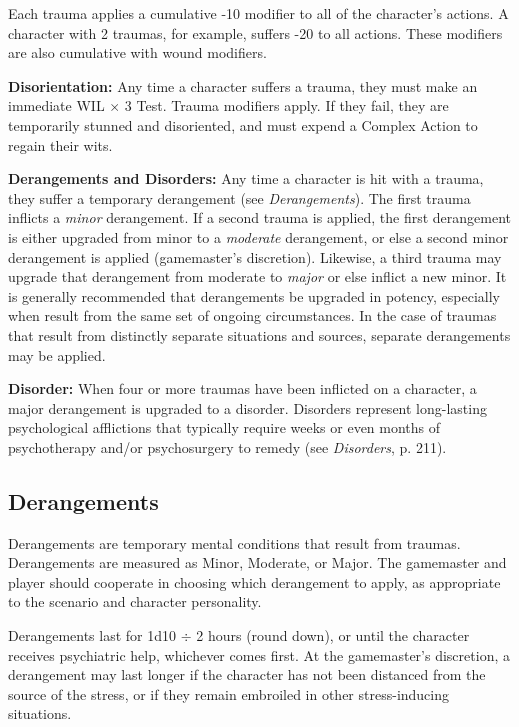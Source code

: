 Each trauma applies a cumulative -10 modifier to all of the character’s actions. A character with 2 traumas, for example, suffers -20 to all actions. These modifiers are also cumulative with wound modifiers.

\textbf{Disorientation:} Any time a character suffers a trauma, they must make an immediate WIL $\times$ 3 Test. Trauma modifiers apply. If they fail, they are temporarily stunned and disoriented, and must expend a Complex Action to regain their wits.

\textbf{Derangements and Disorders:} Any time a character is hit with a trauma, they suffer a temporary derangement (see \emph{Derangements}). The first trauma inflicts a \emph{minor} derangement. If a second trauma is applied, the first derangement is either upgraded from minor to a \emph{moderate} derangement, or else a second minor derangement is applied (gamemaster’s discretion). Likewise, a third trauma may upgrade that derangement from moderate to \emph{major} or else inflict a new minor. It is generally recommended that derangements be upgraded in potency, especially when result from the same set of ongoing circumstances. In the case of traumas that result from distinctly separate situations and sources, separate derangements may be applied.

\textbf{Disorder:} When four or more traumas have been inflicted on a character, a major derangement is upgraded to a disorder. Disorders represent long-lasting psychological afflictions that typically require weeks or even months of psychotherapy and/or psychosurgery to remedy (see \emph{Disorders}, p. 211).


\subsection{Derangements}
\label{sec:derangements}

Derangements are temporary mental conditions that result from traumas. Derangements are measured as Minor, Moderate, or Major. The gamemaster and player should cooperate in choosing which derangement to apply, as appropriate to the scenario and character personality.

Derangements last for 1d10 $\div$ 2 hours (round down), or until the character receives psychiatric help, whichever comes first. At the gamemaster’s discretion, a derangement may last longer if the character has not been distanced from the source of the stress, or if they remain embroiled in other stress-inducing situations.


